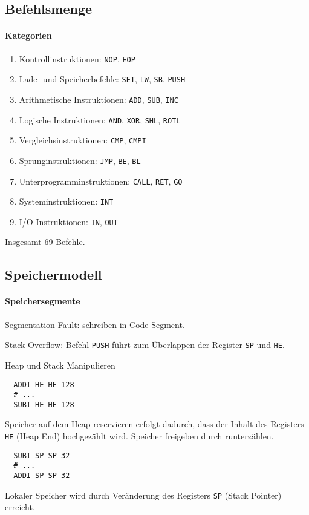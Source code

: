 \subsection{Befehlsmenge}

\begin{frame}{\insertsubsection}
\framesubtitle{Kategorien}
\begin{enumerate}
  \item Kontrollinstruktionen: \texttt{NOP}, \texttt{EOP}
  \item Lade- und Speicherbefehle: 
        \texttt{SET}, \texttt{LW}, \texttt{SB}, \texttt{PUSH}
  \item Arithmetische Instruktionen:
        \texttt{ADD}, \texttt{SUB}, \texttt{INC}
  \item Logische Instruktionen:
        \texttt{AND}, \texttt{XOR}, \texttt{SHL}, \texttt{ROTL}
  \item Vergleichsinstruktionen:
        \texttt{CMP}, \texttt{CMPI}
  \item Sprunginstruktionen:
        \texttt{JMP}, \texttt{BE}, \texttt{BL}
  \item Unterprogramminstruktionen:
        \texttt{CALL}, \texttt{RET}, \texttt{GO}
  \item Systeminstruktionen:
        \texttt{INT}
  \item I/O Instruktionen:
        \texttt{IN}, \texttt{OUT}
\end{enumerate}
Insgesamt 69 Befehle.
\end{frame}



\subsection{Speichermodell}

\begin{frame}{\insertsubsection}
 \framesubtitle{Speichersegmente}
 \begin{center}
  
 \end{center}
 Segmentation Fault: schreiben in Code-Segment.
 
 Stack Overflow: Befehl \texttt{PUSH} führt zum Überlappen der Register
\texttt{SP} und \texttt{HE}.
\end{frame}


\begin{frame}[fragile]{Heap und Stack Manipulieren}
 \begin{lstlisting}
  ADDI HE HE 128
  # ...
  SUBI HE HE 128
 \end{lstlisting}
 Speicher auf dem Heap reservieren erfolgt dadurch, dass der Inhalt des
 Registers \texttt{HE} (Heap End) hochgezählt wird. Speicher freigeben durch
 runterzählen.
 
 \begin{lstlisting}
  SUBI SP SP 32
  # ...
  ADDI SP SP 32
 \end{lstlisting}
 Lokaler Speicher wird durch Veränderung des Registers \texttt{SP} (Stack
 Pointer) erreicht.
\end{frame}



